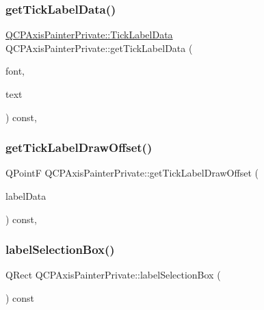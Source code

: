 \subsubsection{\texorpdfstring{getTickLabelData()}{getTickLabelData()}}
{\footnotesize\ttfamily \mbox{\hyperlink{struct_q_c_p_axis_painter_private_1_1_tick_label_data}{Q\+C\+P\+Axis\+Painter\+Private\+::\+Tick\+Label\+Data}} Q\+C\+P\+Axis\+Painter\+Private\+::get\+Tick\+Label\+Data (\begin{DoxyParamCaption}\item[{const Q\+Font \&}]{font,  }\item[{const Q\+String \&}]{text }\end{DoxyParamCaption}) const\hspace{0.3cm}{\ttfamily [protected]}, {\ttfamily [virtual]}}

\mbox{\label{class_q_c_p_axis_painter_private_a6205b60c7d305854ffd7602139433f6e}} 
\subsubsection{\texorpdfstring{getTickLabelDrawOffset()}{getTickLabelDrawOffset()}}
{\footnotesize\ttfamily Q\+PointF Q\+C\+P\+Axis\+Painter\+Private\+::get\+Tick\+Label\+Draw\+Offset (\begin{DoxyParamCaption}\item[{const \mbox{\hyperlink{struct_q_c_p_axis_painter_private_1_1_tick_label_data}{Tick\+Label\+Data}} \&}]{label\+Data }\end{DoxyParamCaption}) const\hspace{0.3cm}{\ttfamily [protected]}, {\ttfamily [virtual]}}

\mbox{\label{class_q_c_p_axis_painter_private_ae7800667d15867040ada5f4bf027f070}} 
\subsubsection{\texorpdfstring{labelSelectionBox()}{labelSelectionBox()}}
{\footnotesize\ttfamily Q\+Rect Q\+C\+P\+Axis\+Painter\+Private\+::label\+Selection\+Box (\begin{DoxyParamCaption}{ }\end{DoxyParamCaption}) const\hspace{0.3cm}{\ttfamily [inline]}}

